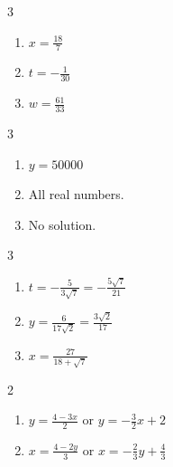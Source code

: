\documentclass{ximera}
\begin{document}
	\author{Stitz-Zeager}


\begin{multicols}{3}
\begin{enumerate}

\item $x = \frac{18}{7}$
\item $t = -\frac{1}{30}$
\item $w = \frac{61}{33}$

\setcounter{HW}{\value{enumi}}
\end{enumerate}
\end{multicols}

\begin{multicols}{3}
\begin{enumerate}
\setcounter{enumi}{\value{HW}}

\item  $y = 50000$
\item  All real numbers.
\item  No solution.

\setcounter{HW}{\value{enumi}}
\end{enumerate}
\end{multicols}


\begin{multicols}{3}
\begin{enumerate}
\setcounter{enumi}{\value{HW}}

\item  $t = -\frac{5}{3\sqrt{7}} = -\frac{5\sqrt{7}}{21}$
\item  $y = \frac{6}{17\sqrt{2}}  = \frac{3 \sqrt{2}}{17}$
\item  $x = \frac{27}{18+\sqrt{7}}$

\setcounter{HW}{\value{enumi}}
\end{enumerate}
\end{multicols}

\begin{multicols}{2}
\begin{enumerate}
\setcounter{enumi}{\value{HW}}
\item  $y = \frac{4 - 3x}{2}$ or $y = -\frac{3}{2}x + 2$
\item  $x = \frac{4 - 2y}{3}$ or $x = -\frac{2}{3} y + \frac{4}{3}$
\setcounter{HW}{\value{enumi}}
\end{enumerate}
\end{multicols}
\end{document}
